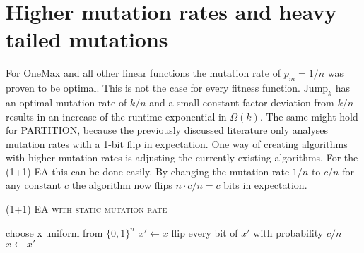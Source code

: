 \section{Higher mutation rates and heavy tailed mutations}
For OneMax and all other linear functions the mutation rate of $p_m=1/n$ was proven to be optimal\cite{witt2013tight}.
This is not the case for every fitness function.
$\text{Jump}_k$ has an optimal mutation rate of $k/n$ and a small constant factor deviation from $k/n$ results in an increase of the runtime exponential in $\Omega(k)$\cite{doerr2017fast}.
The same might hold for PARTITION, because the previously discussed literature only analyses mutation rates with a 1-bit flip in expectation.\newline
One way of creating algorithms with higher mutation rates is adjusting the currently existing algorithms.
For the (1+1) EA this can be done easily.
By changing the mutation rate $1/n$ to $c/n$ for any constant $c$ the algorithm now flips $n\cdot c/n=c$ bits in expectation.
\begin{algorithm}[bt]
      \caption{\textsc{(1+1) EA with static mutation rate}}\label{alg:EA_SM}

      \DontPrintSemicolon %

      \BlankLine
      choose x uniform from ${\{0,1\}}^n$\;
      {
      $x' \leftarrow x$\;
      flip every bit of $x'$ with probability $c/n$\;
      {
      {
            $x \leftarrow x'$\;
      }
      }
      }
\end{algorithm}

